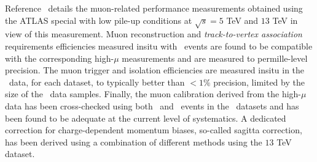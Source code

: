 

Reference~\cite{Sydorenko:2657116} details the muon-related performance measurements obtained using the ATLAS special with low pile-up conditions at $\sqrt{s} = 5$
TeV and $13$ TeV in view of this measurement.
Muon reconstruction and \textit{track-to-vertex association} requirements efficiencies measured
insitu with \Zmm\ events are found to be compatible with the
corresponding high-$\mu$ measurements and are measured to
permille-level precision. The muon trigger and isolation efficiencies
are measured insitu in the \lowmu\ data, for each dataset, to typically better than $<1\%$ precision, limited
by the size of the \Zmm\ data samples. Finally, the muon calibration
derived from the high-$\mu$ data has been cross-checked using both
\Zmm\ and \Jmumu\ events in the \lowmu\ datasets and has been found to be adequate at the
current level of systematics. A dedicated correction for
charge-dependent momentum biases, so-called sagitta correction, has
been derived using a combination of different methods using the $13$ TeV \lowmu dataset.
